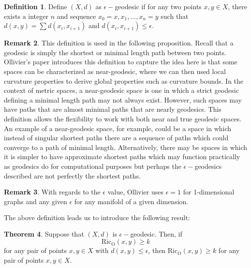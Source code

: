 \documentclass{Dissertate}
\theoremstyle{definition}
\newtheorem{theorem}{Theorem}[section]
\theoremstyle{definition} %
\theoremstyle{definition}
\newtheorem{definition}[theorem]{Definition}
\newtheorem{remark}[theorem]{Remark}
\begin{document}
\begin{definition} \cite{ollivier_ricci_2009} Define $(X,d)$ as $\epsilon-$geodesic if for any two points $x,y \in X$, there exists a integer $n$ and sequence $x_0 = x, x_1,...,x_n =y$ such that $d(x,y) = \sum d(x_i, x_{i+1})$ and $d(x_i, x_{i+1}) \leq \epsilon$. 
\end{definition}
\begin{remark}
This definition is used in the following proposition. Recall that a geodesic is simply the shortest or minimal length path between two points. Ollivier's paper introduces this definition to capture the idea here is that some spaces can be characterized as near-geodesic, where we can then used local curvature properties to derive global properties such as curvature bounds. In the context of metric spaces, a near-geodesic space is one in which a strict geodesic defining a minimal length path may not always exist. However, such spaces may have paths that are almost minimal paths that are nearly geodesics. This definition allows the flexibility to work with both near and true geodesic spaces. An example of a near-geodesic space, for example, could be a space in which instead of singular shortest paths there are a sequence of paths which could converge to a path of minimal length. Alternatively, there may be spaces in which it is simpler to have approximate shortest paths which may function practically as geodesics do for computational purposes but perhaps the $\epsilon-$geodesics described are not perfectly the shortest paths.
\end{remark}
\begin{remark} With regards to the $\epsilon$ value, Ollivier uses $\epsilon =1$ for  1-dimensional graphs and any given $\epsilon$ for any manifold of a given dimension. 
\end{remark}
The above definition leads us to introduce the following result: 
\begin{theorem} \cite{ollivier_ricci_2009} \label{thm: geodesic}  Suppose that $(X,d)$ is $\epsilon-$geodesic. Then, if 
$$
\operatorname{Ric_O}(x,y) \geq k
$$
for any pair of points $x,y \in X$ with $d(x,y) \leq \epsilon$, then $\operatorname{Ric_O}(x,y) \geq k$ for any pair of points $x,y \in X$. 
\end{theorem}
\end{document}

